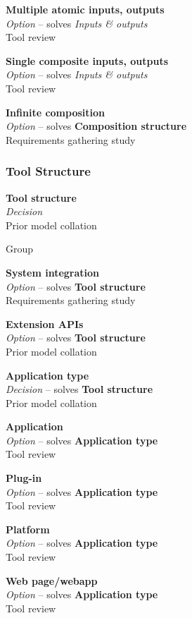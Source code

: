 \textbf{Multiple atomic inputs, outputs} \\ \emph{Option} -- solves \emph{Inputs \& outputs} \\ Tool review

\textbf{Single composite inputs, outputs} \\ \emph{Option} -- solves \emph{Inputs \& outputs} \\ Tool review

\textbf{Infinite composition} \\ \emph{Option} -- solves \textbf{Composition structure} \\ Requirements gathering study

\subsubsection{Tool Structure}

\textbf{Tool structure} \\ \emph{Decision} \\ Prior model collation

Group

\textbf{System integration} \\ \emph{Option} -- solves \textbf{Tool structure} \\ Requirements gathering study

\textbf{Extension APIs} \\ \emph{Option} -- solves \textbf{Tool structure} \\ Prior model collation \cite{Grammel2010}

\textbf{Application type} \\ \emph{Decision} -- solves \textbf{Tool structure} \\ Prior model collation \cite{Minhas2012}

\textbf{Application} \\ \emph{Option} -- solves \textbf{Application type} \\ Tool review

\textbf{Plug-in} \\ \emph{Option} -- solves \textbf{Application type} \\ Tool review

\textbf{Platform} \\ \emph{Option} -- solves \textbf{Application type} \\ Tool review

\textbf{Web page/webapp} \\ \emph{Option} -- solves \textbf{Application type} \\ Tool review

